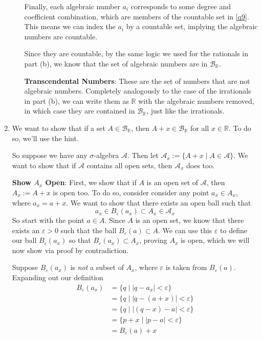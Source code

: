 \documentclass[12pt]{article}
\theoremstyle{plain}
\theoremstyle{definition}
\theoremstyle{remark}
\begin{document}
\begin{enumerate}
\begin{enumerate}
Finally, each algebraic number $a_i$ corresponds to some degree and coefficient combination, which are members of the countable set in \ref{q9}. This means we can index the $a_i$ by a countable set, implying the algebraic numbers are countable.

Since they are countable, by the same logic we used for the rationals in part (b), we know that the set of algebraic numbers are in $\mathscr{B}_\mathbb{R}$. 

\textbf{Transcendental Numbers}: These are the set of numbers that are not algebraic numbers. Completely analogously to the case of the irrationals in part (b), we can write them as $\mathbb{R}$ with the algebraic numbers removed, in which case they are contained in $\mathscr{B}_\mathbb{R}$, just like the irrationals. 


\end{enumerate} 

\item We want to show that if a set $A\in \mathscr{B}_\mathbb{R}$, then $A+x \in \mathscr{B}_\mathbb{R}$ for all $x\in\mathbb{R}$. To do so, we'll use the hint.

So suppose we have any $\sigma$-algebra $\mathscr{A}$. Then let $\mathscr{A}_x := \{ A + x \; | \; A \in \mathscr{A} \}$. We want to show that if $\mathscr{A}$ contains all open sets, then $\mathscr{A}_x$ does too.

\textbf{Show $A_x$ Open}: First, we show that if $A$ is an open set of $\mathscr{A}$, then $A_x := A + x$ is open too.  To do so, consider consider any point $a_x \in A_x$, where $a_x = a+x$. We want to show that there exists an open ball such that
\[
    a_x \in B_\varepsilon(a_x) \subset A_x \in \mathscr{A}_x
\]
So start with the point $a \in A$. Since $A$ is an open set, we know that there exists an $\varepsilon>0$ such that the ball $B_\varepsilon(a) \subset A$. We can use this $\varepsilon$ to define our ball $B_\varepsilon(a_x)$ so that $B_\varepsilon(a_x)\subset A_x$, proving $A_x$ is open, which we will now show via proof by contradiction.

Suppose $B_\varepsilon(a_x)$ is \emph{not} a subset of $A_x$, where $\varepsilon$ is taken from $B_\varepsilon(a)$. Expanding out our definition
\begin{align*}
    B_\varepsilon(a_x) &= \{ q \; | \; |q - a_x| < \varepsilon \}\\
    &= \{ q  \; | \; |q - (a + x) | < \varepsilon \}\\
    &= \{ q  \; | \; |(q - x) - a  | < \varepsilon \}\\
    &= \{ p + x \; | \; |p - a  | < \varepsilon \}\\
    &= B_\varepsilon(a) + x
\end{align*}


\end{enumerate}
\end{document}
